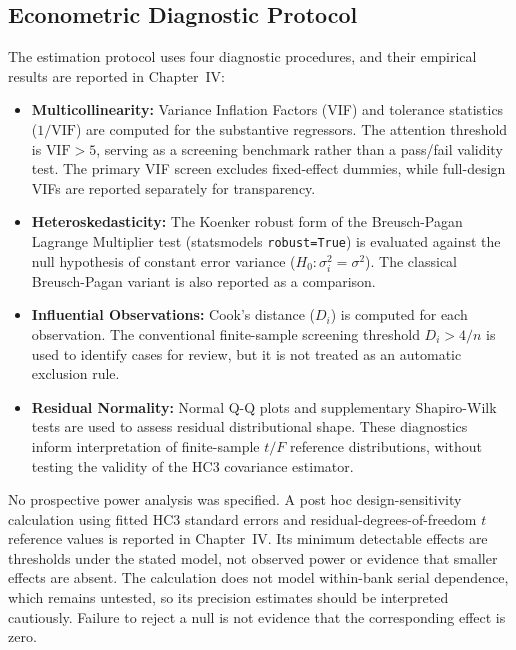 \subsection{Econometric Diagnostic Protocol}
The estimation protocol uses four diagnostic procedures, and their empirical results are reported in Chapter~IV:
\begin{itemize}
    \item \textbf{Multicollinearity:} Variance Inflation Factors (VIF) and tolerance statistics ($1/\text{VIF}$) are computed for the substantive regressors. The attention threshold is $\text{VIF} > 5$, serving as a screening benchmark rather than a pass/fail validity test. The primary VIF screen excludes fixed-effect dummies, while full-design VIFs are reported separately for transparency.
    \item \textbf{Heteroskedasticity:} The Koenker robust form of the Breusch-Pagan Lagrange Multiplier test (statsmodels \texttt{robust=True}) is evaluated against the null hypothesis of constant error variance ($H_0: \sigma_i^2 = \sigma^2$). The classical Breusch-Pagan variant is also reported as a comparison.
    \item \textbf{Influential Observations:} Cook's distance ($D_i$) is computed for each observation. The conventional finite-sample screening threshold $D_i > 4/n$ is used to identify cases for review, but it is not treated as an automatic exclusion rule.
    \item \textbf{Residual Normality:} Normal Q-Q plots and supplementary Shapiro-Wilk tests are used to assess residual distributional shape. These diagnostics inform interpretation of finite-sample $t/F$ reference distributions, without testing the validity of the HC3 covariance estimator.
\end{itemize}

No prospective power analysis was specified. A post hoc design-sensitivity calculation using fitted HC3 standard errors and residual-degrees-of-freedom $t$ reference values is reported in Chapter~IV. Its minimum detectable effects are thresholds under the stated model, not observed power or evidence that smaller effects are absent. The calculation does not model within-bank serial dependence, which remains untested, so its precision estimates should be interpreted cautiously. Failure to reject a null is not evidence that the corresponding effect is zero.

